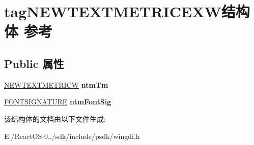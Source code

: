 \hypertarget{structtag_n_e_w_t_e_x_t_m_e_t_r_i_c_e_x_w}{}\section{tag\+N\+E\+W\+T\+E\+X\+T\+M\+E\+T\+R\+I\+C\+E\+X\+W结构体 参考}
\label{structtag_n_e_w_t_e_x_t_m_e_t_r_i_c_e_x_w}
\subsection*{Public 属性}
\begin{DoxyCompactItemize}
\item 
\mbox{\label{structtag_n_e_w_t_e_x_t_m_e_t_r_i_c_e_x_w_a4ae26d04a953d3b6bbd0c1bca7beb276}} 
\hyperlink{structtag_n_e_w_t_e_x_t_m_e_t_r_i_c_w}{N\+E\+W\+T\+E\+X\+T\+M\+E\+T\+R\+I\+CW} {\bfseries ntm\+Tm}
\item 
\mbox{\label{structtag_n_e_w_t_e_x_t_m_e_t_r_i_c_e_x_w_a54d3cdaefc9231cd7694a5b2dc92f55f}} 
\hyperlink{structtag_f_o_n_t_s_i_g_n_a_t_u_r_e}{F\+O\+N\+T\+S\+I\+G\+N\+A\+T\+U\+RE} {\bfseries ntm\+Font\+Sig}
\end{DoxyCompactItemize}


该结构体的文档由以下文件生成\+:\begin{DoxyCompactItemize}
\item 
E\+:/\+React\+O\+S-\/0../sdk/include/psdk/wingdi.\+h\end{DoxyCompactItemize}
